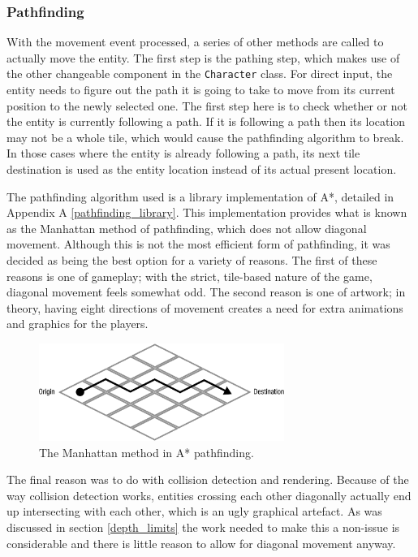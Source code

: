 \subsubsection{Pathfinding}
With the movement event processed, a series of other methods are called to actually move the entity. The first step is the pathing step, which makes use of the other changeable component in the \texttt{Character} class. For direct input, the entity needs to figure out the path it is going to take to move from its current position to the newly selected one. The first step here is to check whether or not the entity is currently following a path. If it is following a path then its location may not be a whole tile, which would cause the pathfinding algorithm to break. In those cases where the entity is already following a path, its next tile destination is used as the entity location instead of its actual present location.

The pathfinding algorithm used is a library implementation of A*, detailed in Appendix A \ref{pathfinding_library}. This implementation provides what is known as the Manhattan method of pathfinding, which does not allow diagonal movement. Although this is not the most efficient form of pathfinding, it was decided as being the best option for a variety of reasons. The first of these reasons is one of gameplay; with the strict, tile-based nature of the game, diagonal movement feels somewhat odd. The second reason is one of artwork; in theory, having eight directions of movement creates a need for extra animations and graphics for the players.

\begin{figure}[H]
    \centering
    \includegraphics[width=8cm]{Images/manhattan_pathfind.eps}
    \caption{The Manhattan method in A* pathfinding.}
    \label{fig:manhattan_pathfind}
\end{figure}

The final reason was to do with collision detection and rendering. Because of the way collision detection works, entities crossing each other diagonally actually end up intersecting with each other, which is an ugly graphical artefact. As was discussed in section \ref{depth_limits} the work needed to make this a non-issue is considerable and there is little reason to allow for diagonal movement anyway.

